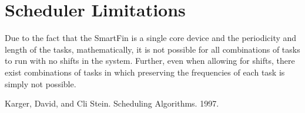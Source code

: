 \documentclass{article}
\begin{document}
\section{Scheduler Limitations}
Due to the fact that the SmartFin is a single core device and the periodicity and length of the tasks, mathematically, it is not possible for all combinations of tasks to run with no shifts in the system. Further, even when allowing for shifts, there exist combinations of tasks in which preserving the frequencies of each task is simply not possible. 



Karger, David, and Cli Stein. Scheduling Algorithms. 1997.
\end{document}
